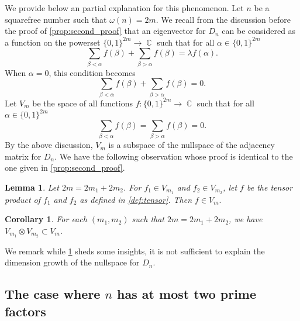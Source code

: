 \documentclass[11pt,a4paper]{amsart}
\newcommand{\tung}[1]{{\color{blue}#1}}
\newtheorem{prop}[thm]{Proposition}
\newtheorem{lem}[thm]{Lemma}
\newtheorem{cor}[thm]{Corollary}
\theoremstyle{definition}
\newtheorem{speculation}[thm]{Speculation}
\DeclareMathOperator{\C}{\mathbb{C}}
\numberwithin{equation}{section}
\begin{document}
We provide below an partial explanation for this phenomenon. Let $n$ be a squarefree number such that $\omega(n)=2m.$ We recall from the discussion before the proof of \cref{prop:second_proof} that an eigenvector for $D_n$ can be considered as a function on the powerset $\{0,1\}^{2m} \to \C$ such that for all $\alpha \in \{0,1\}^{2m}$
\begin{equation*} \sum_{\beta<\alpha} f(\beta) + \sum_{\beta>\alpha} f(\beta) = \lambda f(\alpha). 
\end{equation*}
When $\alpha=0$, this condition becomes 
\[ \sum_{\beta<\alpha} f(\beta) + \sum_{\beta>\alpha} f(\beta) = 0. \]
Let $V_{m}$ be the space of all functions $f: \{0,1\}^{2m} \to \C$ such that for all $\alpha \in \{0,1\}^{2m}$
\[ \sum_{\beta<\alpha} f(\beta) = \sum_{\beta>\alpha} f(\beta)=0. \]
By the above discussion, $V_m$ is a subspace of the nullspace of the adjacency matrix for $D_n.$ We have the following observation whose proof is identical to the one given in \cref{prop:second_proof}.
\begin{lem}
Let $2m = 2m_1 + 2m_2$. For $f_1 \in V_{m_1}$ and $f_2 \in V_{m_2}$, let $f$ be the tensor product of $f_{1}$ and $f_2$ as defined in \cref{def:tensor}. Then $f \in V_{m}.$ 
\end{lem}

\begin{cor} \label{cor:inclusion}
    For each $(m_1, m_2)$ such that $2m= 2m_1 + 2m_2$, we have $V_{m_1} \otimes V_{m_2} \subset V_{m}.$
\end{cor}
We remark while \cref{cor:inclusion} sheds some insights, it is not sufficient to explain the dimension growth of the nullspace for $D_n.$ 

        
\subsection{The case where $n$ has at most two prime factors}
\end{document}
